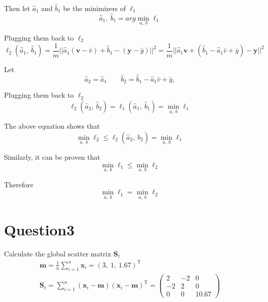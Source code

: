 \documentclass{article}
\begin{document}
Then let $\hat{a}_{1}$ and $\hat{b}_{1}$ be the minimizers of $\ell_{1}$
\begin{equation*}
    \hat{a}_{1},\ \hat{b}_{1} = arg \min_{a,\ b} \ell_{1}
\end{equation*}

Plugging them back to $\ell_{2}$
\begin{equation*}
    \ell_{2}(\hat{a}_{1},\ \hat{b}_{1}) 
    = \frac{1}{m} || \hat{a}_{1} (\boldsymbol{v} - \bar{v}) + \hat{b}_{1} - (\boldsymbol{y} - \bar{y}) ||^{2}
    = \frac{1}{m} || \hat{a}_{1} \boldsymbol{v} + (\hat{b}_{1} - \hat{a}_{1} \bar{v} + \bar{y})  - \boldsymbol{y} ||^{2}
\end{equation*}

Let
\begin{equation*}
    \hat{a}_{2} = \hat{a}_{1} \qquad \hat{b}_{2} = \hat{b}_{1} - \hat{a}_{1} \bar{v} + \bar{y},
\end{equation*}

Plugging them back to $\ell_{2}$
\begin{equation*}
    \ell_{2}(\hat{a}_{2},\ \hat{b}_{2}) = \ell_{1}(\hat{a}_{1},\ \hat{b}_{1}) = \min_{a,\ b} \ell_{1}
\end{equation*}

The above equation shows that
\begin{equation*}
    \min_{a,\ b} \ell_{2} \le \ell_{2}(\hat{a}_{2},\ \hat{b}_{2}) = \min_{a,\ b} \ell_{1}
\end{equation*}

Similarly, it can be proven that
\begin{equation*}
    \min_{a,\ b} \ell_{1} \le \min_{a,\ b} \ell_{2}
\end{equation*}

Therefore
\begin{equation*}
    \min_{a,\ b} \ell_{1} = \min_{a,\ b} \ell_{2}
\end{equation*}

\section*{Question3}

Calculate the global scatter matrix $\mathbf{S}_{t}$
\begin{gather*}
    \boldsymbol{m} = \frac{1}{n} \sum_{i = 1}^{n} \boldsymbol{x}_{i} = 
    (3,\ 1,\ 1.67)^{\mathrm{T}} \\
    \mathbf{S}_{t} = \sum_{i = 1}^{n} (\boldsymbol{x}_{i} - \boldsymbol{m}) 
    (\boldsymbol{x}_{i} - \boldsymbol{m})^{\mathrm{T}} = 
    \begin{pmatrix}
        2   &   -2  &   0 \\
        -2  &   2   &   0 \\
        0   &   0   &   10.67
    \end{pmatrix}
\end{gather*}
\end{document}

